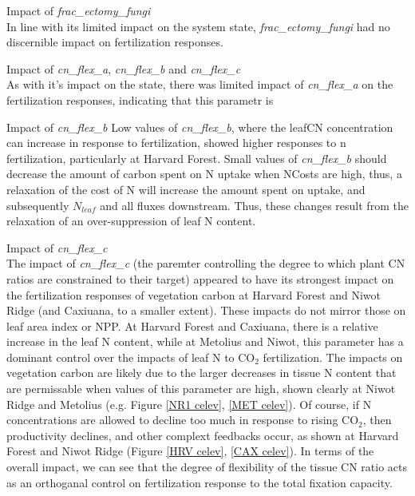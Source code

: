 \documentclass[draft,linenumbers]{agujournal}
\begin{document}
Impact of \emph{frac\_ectomy\_fungi}\\
In line with its limited impact on the system state, \emph{frac\_ectomy\_fungi} had no discernible impact on fertilization responses. 

Impact of \emph{cn\_flex\_a}, \emph{cn\_flex\_b} and \emph{cn\_flex\_c}\\
As with it's impact on the state, there was limited impact of \emph{cn\_flex\_a} on the fertilization responses, indicating that this parametr is 

Impact of \emph{cn\_flex\_b}
Low values of \emph{cn\_flex\_b}, where the leafCN concentration can increase in response to fertilization, showed higher responses to n fertilization, particularly at Harvard Forest. Small values of  \emph{cn\_flex\_b} should  decrease the amount of carbon spent on N uptake when NCosts are high, thus, a relaxation of the cost of N will increase the amount spent on uptake, and subsequently $N_{leaf}$ and all fluxes downstream.  Thus, these changes result from the relaxation of an over-suppression of leaf N content. 

Impact of \emph{cn\_flex\_c}\\
The impact of \emph{cn\_flex\_c} (the paremter controlling the degree to which plant CN ratios are constrained to their target) appeared to have its strongest impact on the fertilization responses of vegetation carbon at Harvard Forest and Niwot Ridge (and Caxiuana, to a smaller extent). These impacts do not mirror those on leaf area index or NPP. At Harvard Forest and Caxiuana, there is a relative increase in the leaf N content, while at Metolius and Niwot, this parameter has a dominant control over the impacts of leaf N to CO$_{2}$ fertilization.  The impacts on vegetation carbon are likely due to the larger decreases in tissue N content that are permissable when values of this parameter are high, shown clearly at Niwot Ridge and Metolius (e.g. Figure \ref{NR1 celev}, \ref{MET celev}).  Of course, if N concentrations are allowed to decline too much in response to rising CO$_{2}$, then productivity declines, and other complext feedbacks occur, as shown at Harvard Forest and Niwot Ridge (Figure \ref{HRV celev}, \ref{CAX celev}).  In terms of the overall impact, we can see that the degree of flexibility of the tissue CN ratio acts as an orthoganal control on fertilization response to the total fixation capacity.
\end{document}
